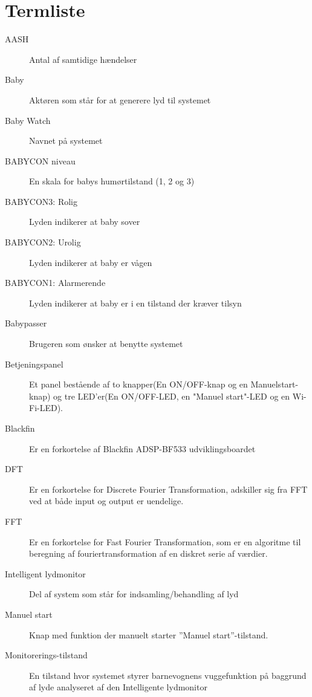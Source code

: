 \chapter{Termliste}


\begin{description}
\item[AASH] Antal af samtidige hændelser
\item[Baby] Aktøren som står for at generere lyd til systemet
\item[Baby Watch] Navnet på systemet
\item[BABYCON niveau] En skala for babys humørtilstand (1, 2 og 3)
\item[BABYCON3: Rolig] Lyden indikerer at baby sover
\item[BABYCON2: Urolig] Lyden indikerer at baby er vågen
\item[BABYCON1: Alarmerende] Lyden indikerer at baby er i en tilstand der kræver tilsyn
\item[Babypasser] Brugeren som ønsker at benytte systemet
\item[Betjeningspanel]Et panel bestående af to knapper(En ON/OFF-knap og en Manuelstart-knap) og tre LED'er(En ON/OFF-LED, en "Manuel start"-LED og en Wi-Fi-LED).
\item[Blackfin] Er en forkortelse af Blackfin ADSP-BF533 udviklingsboardet
\item[DFT] Er en forkortelse for Discrete Fourier Transformation, adskiller sig fra FFT ved at både input og output er uendelige. 
\item[FFT] Er en forkortelse for Fast Fourier Transformation, som er en algoritme til beregning af fouriertransformation af en diskret serie af værdier. 
\item[Intelligent lydmonitor] Del af system som står for indsamling/behandling af lyd
\item[Manuel start] Knap med funktion der manuelt starter ''Manuel start''-tilstand.
\item[Monitorerings-tilstand] En tilstand hvor systemet styrer barnevognens vuggefunktion på baggrund af lyde analyseret af den Intelligente lydmonitor

\end{description}
